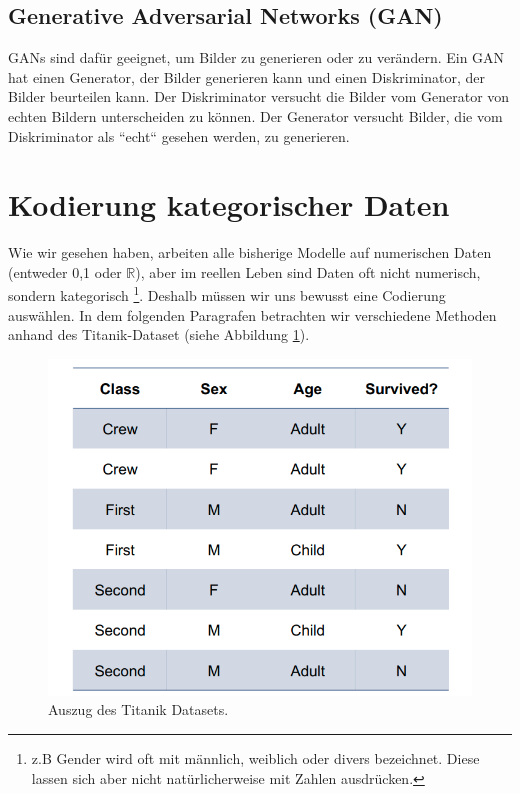\subsection{Generative Adversarial Networks (GAN)}
GANs sind dafür geeignet, um Bilder zu generieren oder zu verändern. Ein GAN hat einen Generator, der Bilder generieren kann und einen Diskriminator, der Bilder beurteilen kann. Der Diskriminator versucht die Bilder vom Generator von echten Bildern unterscheiden zu können. Der Generator versucht Bilder, die vom Diskriminator als ``echt`` gesehen werden, zu generieren.

\section{Kodierung kategorischer Daten}
Wie wir gesehen haben, arbeiten alle bisherige Modelle auf numerischen Daten (entweder {0,1} oder $\mathbb{R}$), aber im reellen Leben sind Daten oft nicht numerisch, sondern kategorisch \footnote{z.B Gender wird oft mit männlich, weiblich oder divers bezeichnet. Diese lassen sich aber nicht natürlicherweise mit Zahlen ausdrücken. }. Deshalb müssen wir uns bewusst eine Codierung auswählen. In dem folgenden Paragrafen betrachten wir verschiedene Methoden anhand des Titanik-Dataset (siehe Abbildung \ref{fig:titanik-dataset}).

\begin{figure}
    \centering
    \includegraphics[scale=0.4]{Figures/Ml-Titanik-Dataset.png}
    \caption{Auszug des Titanik Datasets. }
    \label{fig:titanik-dataset}
\end{figure}
